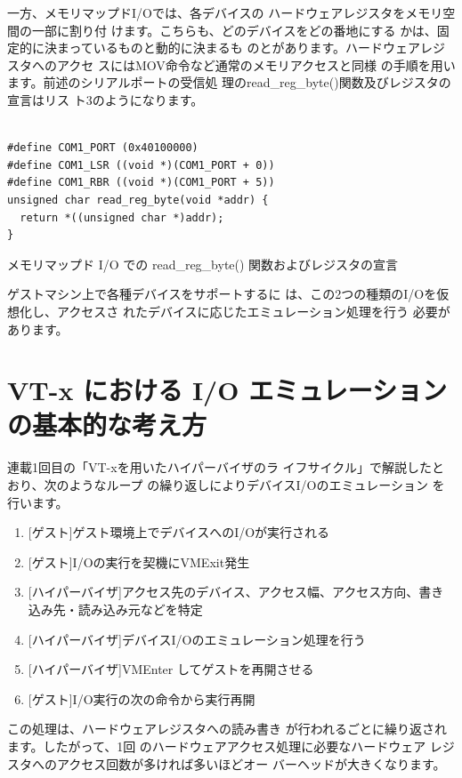  一方、メモリマップドI/Oでは、各デバイスの
ハードウェアレジスタをメモリ空間の一部に割り付
けます。こちらも、どのデバイスをどの番地にする
かは、固定的に決まっているものと動的に決まるも
のとがあります。ハードウェアレジスタへのアクセ
スにはMOV命令など通常のメモリアクセスと同様
の手順を用います。前述のシリアルポートの受信処
理のread\_reg\_byte()関数及びレジスタの宣言はリス
ト3のようになります。

\begin{program}\centering

\begin{verbatim}

#define COM1_PORT (0x40100000)
#define COM1_LSR ((void *)(COM1_PORT + 0))
#define COM1_RBR ((void *)(COM1_PORT + 5))
unsigned char read_reg_byte(void *addr) {
  return *((unsigned char *)addr);
}
\end{verbatim}
\caption{メモリマップド I/O での read\_reg\_byte() 関数およびレジスタの宣言}
\end{program}

 ゲストマシン上で各種デバイスをサポートするに
は、この2つの種類のI/Oを仮想化し、アクセスさ
れたデバイスに応じたエミュレーション処理を行う
必要があります。


\section{VT-x における I/O エミュレーションの基本的な考え方}

 連載1回目の「VT-xを用いたハイパーバイザのラ
イフサイクル」で解説したとおり、次のようなループ
の繰り返しによりデバイスI/Oのエミュレーション
を行います。

\begin{enumerate}
\item{[ゲスト]ゲスト環境上でデバイスへのI/Oが実行される}
\item{[ゲスト]I/Oの実行を契機にVMExit発生}
\item{[ハイパーバイザ]アクセス先のデバイス、アクセス幅、アクセス方向、書き込み先・読み込み元などを特定}
\item{[ハイパーバイザ]デバイスI/Oのエミュレーション処理を行う}
\item{[ハイパーバイザ]VMEnter してゲストを再開させる}
\item{[ゲスト]I/O実行の次の命令から実行再開}
\end{enumerate}

 この処理は、ハードウェアレジスタへの読み書き
が行われるごとに繰り返されます。したがって、1回
のハードウェアアクセス処理に必要なハードウェア
レジスタへのアクセス回数が多ければ多いほどオー
バーヘッドが大きくなります。


